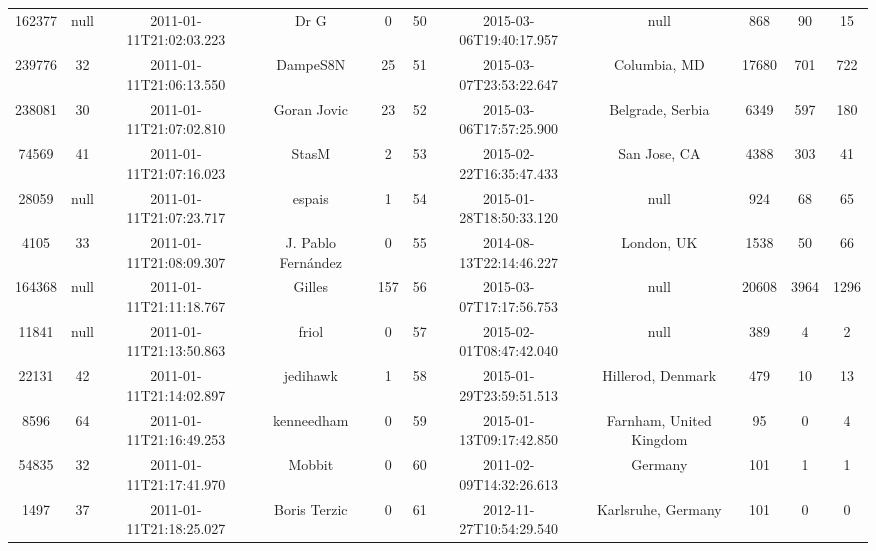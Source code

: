\documentclass[12pt,a4paper,twoside,openright,titlepage,final]{article}
\begin{document}
\begin{landscape}
\begin{center}
\begin{longtable}{@{\extracolsep{\fill}}*{11}{c}}
			162377    & null & 2011-01-11T21:02:03.223 & Dr G                  & 0         & 50    & 2015-03-06T19:40:17.957 & null                             & 868        & 90      & 15    \\
			239776    & 32   & 2011-01-11T21:06:13.550 & DampeS8N              & 25        & 51    & 2015-03-07T23:53:22.647 & Columbia, MD                     & 17680      & 701     & 722   \\
			238081    & 30   & 2011-01-11T21:07:02.810 & Goran Jovic           & 23        & 52    & 2015-03-06T17:57:25.900 & Belgrade, Serbia                 & 6349       & 597     & 180   \\
			74569     & 41   & 2011-01-11T21:07:16.023 & StasM                 & 2         & 53    & 2015-02-22T16:35:47.433 & San Jose, CA                     & 4388       & 303     & 41    \\
			28059     & null & 2011-01-11T21:07:23.717 & espais                & 1         & 54    & 2015-01-28T18:50:33.120 & null                             & 924        & 68      & 65    \\
			4105      & 33   & 2011-01-11T21:08:09.307 & J. Pablo Fernández    & 0         & 55    & 2014-08-13T22:14:46.227 & London, UK                       & 1538       & 50      & 66    \\
			164368    & null & 2011-01-11T21:11:18.767 & Gilles                & 157       & 56    & 2015-03-07T17:17:56.753 & null                             & 20608      & 3964    & 1296  \\
			11841     & null & 2011-01-11T21:13:50.863 & friol                 & 0         & 57    & 2015-02-01T08:47:42.040 & null                             & 389        & 4       & 2     \\
			22131     & 42   & 2011-01-11T21:14:02.897 & jedihawk              & 1         & 58    & 2015-01-29T23:59:51.513 & Hillerod, Denmark                & 479        & 10      & 13    \\
			8596      & 64   & 2011-01-11T21:16:49.253 & kenneedham            & 0         & 59    & 2015-01-13T09:17:42.850 & Farnham, United Kingdom          & 95         & 0       & 4     \\
			54835     & 32   & 2011-01-11T21:17:41.970 & Mobbit                & 0         & 60    & 2011-02-09T14:32:26.613 & Germany                          & 101        & 1       & 1     \\
			1497      & 37   & 2011-01-11T21:18:25.027 & Boris Terzic          & 0         & 61    & 2012-11-27T10:54:29.540 & Karlsruhe, Germany               & 101        & 0       & 0     \\

\end{longtable}
\end{center}
\end{landscape}
\end{document}
